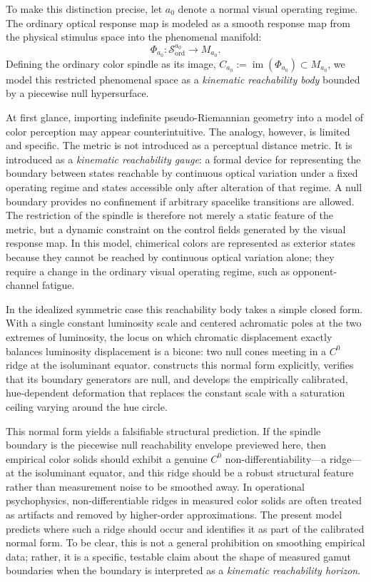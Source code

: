 \documentclass[preprint,12pt,authoryear]{elsarticle}
\theoremstyle{plain}
\theoremstyle{definition}
\theoremstyle{remark}
\begin{document}
To make this distinction precise, let $a_0$ denote a normal visual operating regime. The ordinary optical response map is modeled as a smooth response map from the physical stimulus space into the phenomenal manifold:
\[
\Phi_{a_0}:\mathcal{S}_{\mathrm{ord}}^{a_0} \longrightarrow M_{a_0}.
\]
Defining the ordinary color spindle as its image, $C_{a_0} := \operatorname{im}(\Phi_{a_0}) \subset M_{a_0}$, we model this restricted phenomenal space as a \textit{kinematic reachability body} bounded by a piecewise null hypersurface.

At first glance, importing indefinite pseudo-Riemannian geometry into a model of color perception may appear counterintuitive. The analogy, however, is limited and specific. The metric is not introduced as a perceptual distance metric. It is introduced as a \textit{kinematic reachability gauge}: a formal device for representing the boundary between states reachable by continuous optical variation under a fixed operating regime and states accessible only after alteration of that regime. A null boundary provides no confinement if arbitrary spacelike transitions are allowed. The restriction of the spindle is therefore not merely a static feature of the metric, but a dynamic constraint on the control fields generated by the visual response map. In this model, chimerical colors are represented as exterior states because they cannot be reached by continuous optical variation alone; they require a change in the ordinary visual operating regime, such as opponent-channel fatigue.

In the idealized symmetric case this reachability body takes a simple closed form. With a single constant luminosity scale and centered achromatic poles at the two extremes of luminosity, the locus on which chromatic displacement exactly balances luminosity displacement is a bicone: two null cones meeting in a $C^0$ ridge at the isoluminant equator.  constructs this normal form explicitly, verifies that its boundary generators are null, and develops the empirically calibrated, hue-dependent deformation that replaces the constant scale with a saturation ceiling varying around the hue circle.

This normal form yields a falsifiable structural prediction. If the spindle boundary is the piecewise null reachability envelope previewed here, then empirical color solids should exhibit a genuine $C^0$ non-differentiability---a ridge---at the isoluminant equator, and this ridge should be a robust structural feature rather than measurement noise to be smoothed away. In operational psychophysics, non-differentiable ridges in measured color solids are often treated as artifacts and removed by higher-order approximations. The present model predicts where such a ridge should occur and identifies it as part of the calibrated normal form. To be clear, this is not a general prohibition on smoothing empirical data; rather, it is a specific, testable claim about the shape of measured gamut boundaries when the boundary is interpreted as a \textit{kinematic reachability horizon}.
\end{document}
